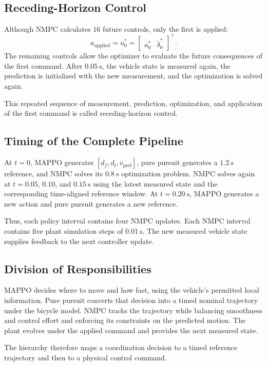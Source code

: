 \documentclass[letterpaper,10pt,conference]{ieeeconf}
\begin{document}
\subsection{Receding-Horizon Control}

Although NMPC calculates $16$ future controls, only the first is applied:
\begin{equation}
    u_{\mathrm{applied}}=u_0^*
    =\begin{bmatrix}a_0^* & \dot{\delta}_0^*\end{bmatrix}^{\!\top}.
\end{equation}
The remaining controls allow the optimizer to evaluate the future
consequences of the first command. After $0.05~\mathrm{s}$, the vehicle state
is measured again, the prediction is initialized with the new measurement,
and the optimization is solved again.

This repeated sequence of measurement, prediction, optimization, and
application of the first command is called receding-horizon control.

\subsection{Timing of the Complete Pipeline}

At $t=0$, MAPPO generates $[d_f,d_l,v_{\mathrm{pref}}]$, pure pursuit
generates a $1.2~\mathrm{s}$ reference, and NMPC solves its
$0.8~\mathrm{s}$ optimization problem. NMPC solves again at
$t=0.05$, $0.10$, and $0.15~\mathrm{s}$ using the latest measured state
and the corresponding time-aligned reference window. At $t=0.20~\mathrm{s}$,
MAPPO generates a new action and pure pursuit generates a new reference.

Thus, each policy interval contains four NMPC updates. Each NMPC interval
contains five plant simulation steps of $0.01~\mathrm{s}$. The new measured
vehicle state supplies feedback to the next controller update.

\subsection{Division of Responsibilities}

MAPPO decides where to move and how fast, using the vehicle's permitted local
information. Pure pursuit converts that decision into a timed nominal
trajectory under the bicycle model. NMPC tracks the trajectory while
balancing smoothness and control effort and enforcing its constraints on
the predicted motion. The plant evolves under the applied command and
provides the next measured state.

The hierarchy therefore maps a coordination decision to a timed reference
trajectory and then to a physical control command.

\end{document}

